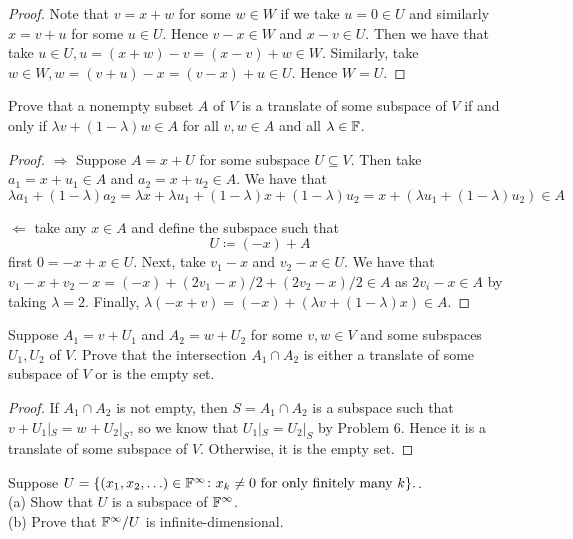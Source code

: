 \documentclass{extarticle}
\begin{document}
\begin{proof}
Note that \(v = x + w\) for some \(w \in W\) if we take \(u = 0 \in U\) and similarly 
\(x = v + u\) for some \(u \in U\). Hence \(v - x \in W\) and \(x - v \in U\). Then we 
have that take \(u \in U, u = (x + w) - v = (x - v) + w \in W\). Similarly, take 
\(w \in W, w = (v + u) - x = (v - x) + u \in U\). Hence \(W = U\). 
\end{proof}

\begin{problem}{9}
    Prove that a nonempty subset \(A\) of \(V\) is a translate of some subspace of \(V\) if and only 
    if \(\lambda v + (1 - \lambda) w \in A\) for all \(v, w \in A\) and all \(\lambda \in \mathbb{F}\). 
\end{problem}

\begin{proof}
\(\Rightarrow\) Suppose \(A = x + U\) for some subspace \(U \subseteq V\). Then take 
\(a_1 = x + u_1 \in A\) and \(a_2 = x + u_2 \in A\). We have that 
\[\lambda a_1 + (1 - \lambda) a_2 = \lambda x + \lambda u_1 + (1 - \lambda)x + (1 - \lambda)u_2 
= x + (\lambda u_1 + (1 - \lambda)u_2) \in A\]

\(\Leftarrow\) take any \(x \in A\) and define the subspace such that 
\[U \coloneq (-x) + A\]
first \(0 = -x + x \in U\). Next, take \(v_1 - x\) and \(v_2 - x \in U\). We have that 
\(v_1 - x + v_2 - x = (-x) + (2v_1 - x)/2 + (2v_2 - x)/2 \in A\) as \(2v_i - x \in A\)
by taking \(\lambda = 2\). Finally, \(\lambda (-x + v) = (-x) + (\lambda v + (1 - \lambda) x) \in A\). 

\end{proof}

\begin{problem}{10}
    Suppose \(A_1 = v + U_1\) and \(A_2 = w + U_2\) for some \(v, w \in V\) and some subspaces 
    \(U_1, U_2\) of \(V\). Prove that the intersection \(A_1 \cap A_2\) is either a translate of 
    some subspace of \(V\) or is the empty set. 
\end{problem}

\begin{proof}
If \(A_1 \cap A_2\) is not empty, then \(S = A_1 \cap A_2\) is a subspace such that \(v + U_1|_S = w + U_2|_S\),
so we know that \(U_1 |_S = U_2 |_S\) by Problem 6. Hence it is a translate of some subspace of \(V\). Otherwise,
it is the empty set. 
\end{proof}

\begin{problem}{11}
    Suppose \(U = \{(x_1, x_2, \ldots) \in \mathbb{F}^\infty \colon x_k \neq 0 \text{ for only finitely many }k\}.\).\\ 
    (a) Show that \(U\) is a subspace of \(\mathbb{F}^\infty\). \\ 
    (b) Prove that \(\mathbb{F}^\infty / U\) is infinite-dimensional. 
\end{problem}
\end{document}
